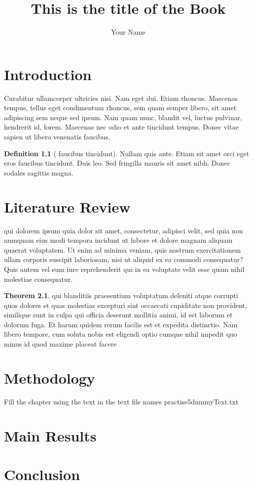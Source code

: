 \documentclass[oneside]{book}
\title{This is the title of the Book}
\author{Your Name}
\date{}
\theoremstyle{definition}
\newtheorem{definition}{Definition}[chapter]
\theoremstyle{default}
\newtheorem{theorem}{Theorem}[chapter]
\begin{document}
	\maketitle
	
	
	
	\chapter{Introduction}
	 Curabitur ullamcorper ultricies nisi. Nam eget dui. Etiam rhoncus. Maecenas tempus, tellus eget condimentum rhoncus, sem quam semper libero, sit amet adipiscing sem neque sed ipsum. Nam quam nunc, blandit vel, luctus pulvinar, hendrerit id, lorem. Maecenas nec odio et ante tincidunt tempus. Donec vitae sapien ut libero venenatis faucibus. 
	
	\begin{definition}[ faucibus tincidunt]
	Nullam quis ante. Etiam sit amet orci eget eros faucibus tincidunt. Duis leo. Sed fringilla mauris sit amet nibh. Donec sodales sagittis magna.
	\end{definition}
	
	
	\chapter{Literature Review}
	qui dolorem ipsum quia dolor sit amet, consectetur, adipisci velit, sed quia non numquam eius modi tempora incidunt ut labore et dolore magnam aliquam quaerat voluptatem. Ut enim ad minima veniam, quis nostrum exercitationem ullam corporis suscipit laboriosam, nisi ut aliquid ex ea commodi consequatur? Quis autem vel eum iure reprehenderit qui in ea voluptate velit esse quam nihil molestiae consequatur.
		\begin{theorem}
		qui blanditiis praesentium voluptatum deleniti atque corrupti quos dolores et quas molestias excepturi sint occaecati cupiditate non provident, similique sunt in culpa qui officia deserunt mollitia animi, id est laborum et dolorum fuga. Et harum quidem rerum facilis est et expedita distinctio. Nam libero tempore, cum soluta nobis est eligendi optio cumque nihil impedit quo minus id quod maxime placeat facere
		\end{theorem}
	
	
	\chapter{Methodology}
	
	Fill the chapter using the text in the text file names practise5dummyText.txt
	
	
	\chapter{Main Results}
	
	
	
	\chapter{Conclusion}
	
	
\end{document}
